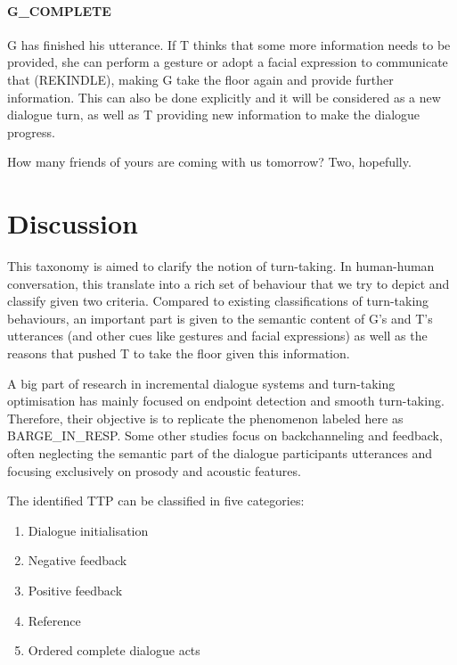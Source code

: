                   	\paragraph{G\_COMPLETE} G has finished his utterance. If T thinks that some more information needs to be provided, she can perform a gesture or adopt a facial expression to communicate that (REKINDLE), making G take the floor again and provide further information. This can also be done explicitly and it will be considered as a new dialogue turn, as well as T providing new information to make the dialogue progress.
                    
                    	\begin{dialogue}
							 How many friends of yours are coming with us tomorrow?
							 Two, hopefully.
						\end{dialogue}

\section{Discussion}

	This taxonomy is aimed to clarify the notion of turn-taking. In human-human conversation, this translate into a rich set of behaviour that we try to depict and classify given two criteria. Compared to existing classifications of turn-taking behaviours, an important part is given to the semantic content of G's and T's utterances (and other cues like gestures and facial expressions) as well as the reasons that pushed T to take the floor given this information.
    
    A big part of research in incremental dialogue systems and turn-taking optimisation has mainly focused on endpoint detection \cite{Raux2008} and smooth turn-taking. Therefore, their objective is to replicate the phenomenon labeled here as BARGE\_IN\_RESP. Some other studies focus on backchanneling and feedback, often neglecting the semantic part of the dialogue participants utterances and focusing exclusively on prosody and acoustic features.
    


    The identified TTP can be classified in five categories:
    
    \begin{enumerate}
      \item Dialogue initialisation
      \item Negative feedback
      \item Positive feedback
      \item Reference
      \item Ordered complete dialogue acts
    \end{enumerate}

